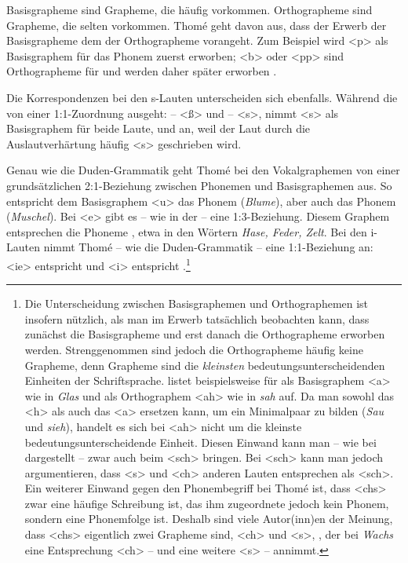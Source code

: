 Basisgrapheme sind Grapheme, die häufig vorkommen. Orthographeme sind Grapheme, die selten vorkommen. Thomé geht davon aus, dass der Erwerb der Basisgrapheme dem der Orthographeme vorangeht. Zum Beispiel wird <p> als Basisgraphem für das Phonem  zuerst erworben; <b> oder <pp> sind Orthographeme für  und werden daher später erworben \citep[89--90]{Thome2019}. 

Die Korrespondenzen bei den s-Lauten unterscheiden sich ebenfalls. Während die \citet[910]{Duden2022} von einer 1:1-Zuordnung ausgeht:  -- <ß> und  -- <s>, nimmt \citet{Thome2019} <s> als Basisgraphem für beide Laute,  und  an, weil der Laut \textipa{[s]} durch die Auslautverhärtung häufig <s> geschrieben wird.

Genau wie die Duden-Grammatik geht Thomé bei den Vokalgraphemen von einer grundsätzlichen 2:1-Beziehung zwischen Phonemen und Basisgraphemen aus. So entspricht dem Basisgraphem <u> das Phonem  (\textit{Blume}), aber auch das Phonem  (\textit{Muschel}). Bei <e> gibt es -- wie in der \citet{Duden2022} -- eine 1:3-Beziehung. Diesem Graphem entsprechen die Phoneme , etwa in den Wörtern \textit{Hase, Feder, Zelt}. Bei den i-Lauten nimmt Thomé -- wie die Duden-Grammatik -- eine 1:1-Beziehung an: <ie> entspricht  und <i> entspricht .\footnote{Die Unterscheidung zwischen Basisgraphemen und Orthographemen ist insofern nützlich, als man im Erwerb tatsächlich beobachten kann, dass zunächst die Basisgrapheme und erst danach die Orthographeme erworben werden. Strenggenommen sind jedoch die Orthographeme häufig keine Grapheme, denn Grapheme sind die \textit{kleinsten} bedeutungsunterscheidenden Einheiten der Schriftsprache. \citet[89]{Thome2019} listet beispielsweise für  als Basisgraphem <a> wie in \textit{Glas} und als Orthographem <ah> wie in \textit{sah} auf. Da man sowohl das <h> als auch das <a> ersetzen kann, um ein Minimalpaar zu bilden (\textit{Sau} und \textit{sieh}), handelt es sich bei <ah> nicht um die kleinste bedeutungsunterscheidende Einheit. Diesen Einwand kann man -- wie bei \citet{FuhrhopThierrof2005} dargestellt -- zwar auch beim <sch> bringen. Bei <sch> kann man jedoch argumentieren, dass <s> und <ch> anderen Lauten entsprechen als <sch>. Ein weiterer Einwand gegen den Phonembegriff bei Thomé ist, dass <chs> zwar eine häufige Schreibung ist, das ihm zugeordnete  jedoch kein Phonem, sondern eine Phonemfolge ist. Deshalb sind viele Autor(inn)en der Meinung, dass <chs> eigentlich zwei Grapheme sind, <ch> und <s>, \zB \citet[96]{Nerius1989}, der bei \textit{Wachs} eine Entsprechung <ch> --  und eine weitere <s> --  annimmt.}

